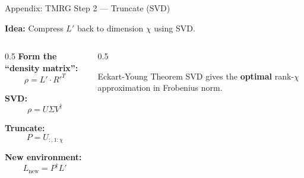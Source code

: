 \documentclass[aspectratio=169, 11pt]{beamer}
\begin{document}
\begin{frame}{Appendix: TMRG Step 2 --- Truncate (SVD)}
    
    \textbf{Idea:} Compress $L'$ back to dimension $\chi$ using SVD.
    
    \vspace{0.3cm}
    
    \begin{columns}
        \begin{column}{0.5\textwidth}
            \textbf{Form the ``density matrix'':}
            \[
            \rho = L' \cdot R'^T
            \]
            
            \textbf{SVD:}
            \[
            \rho = U \Sigma V^\dagger
            \]
            
            \textbf{Truncate:}
            \[
            P = U_{:, 1:\chi}
            \]
            
            \textbf{New environment:}
            \[
            L_{\text{new}} = P^\dagger L'
            \]
        \end{column}
        
        \begin{column}{0.5\textwidth}
            \begin{center}
            \end{center}
            
            \begin{block}{Eckart-Young Theorem}
                SVD gives the \textbf{optimal} rank-$\chi$ approximation in Frobenius norm.
            \end{block}
        \end{column}
    \end{columns}
\end{frame}
\end{document}
